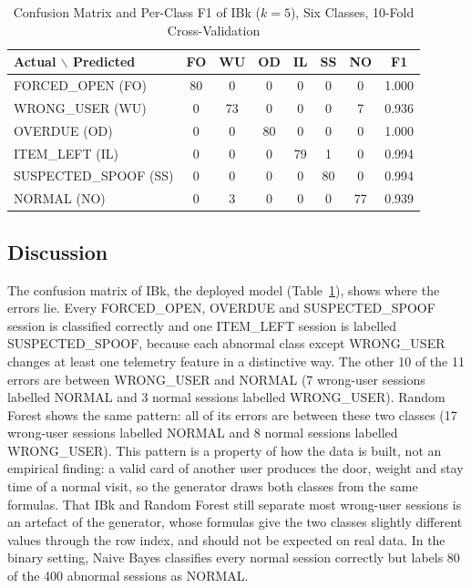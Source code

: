 \documentclass[conference, onecolumn]{IEEEtran}
\begin{document}
\begin{table}[H]
\renewcommand{\arraystretch}{1.3}
\centering
\caption{Confusion Matrix and Per-Class F1 of IBk ($k=5$), Six Classes, 10-Fold Cross-Validation}
\label{tab:cm}
\begin{tabular}{l c c c c c c c}
\hline
\textbf{Actual $\backslash$ Predicted} & \textbf{FO} & \textbf{WU} & \textbf{OD} & \textbf{IL} & \textbf{SS} & \textbf{NO} & \textbf{F1} \\
\hline
FORCED\_OPEN (FO)     & 80 & 0  & 0  & 0  & 0  & 0  & 1.000 \\
WRONG\_USER (WU)      & 0  & 73 & 0  & 0  & 0  & 7  & 0.936 \\
OVERDUE (OD)          & 0  & 0  & 80 & 0  & 0  & 0  & 1.000 \\
ITEM\_LEFT (IL)       & 0  & 0  & 0  & 79 & 1  & 0  & 0.994 \\
SUSPECTED\_SPOOF (SS) & 0  & 0  & 0  & 0  & 80 & 0  & 0.994 \\
NORMAL (NO)           & 0  & 3  & 0  & 0  & 0  & 77 & 0.939 \\
\hline
\end{tabular}
\end{table}

\subsection{Discussion}

The confusion matrix of IBk, the deployed model (Table~\ref{tab:cm}), shows where the errors
lie. Every FORCED\_OPEN, OVERDUE and SUSPECTED\_SPOOF session is classified correctly and one ITEM\_LEFT session is
labelled SUSPECTED\_SPOOF, because each abnormal class except WRONG\_USER changes at least one telemetry feature in a
distinctive way. The other 10 of the 11 errors are between WRONG\_USER and NORMAL (7 wrong-user sessions labelled
NORMAL and 3 normal sessions labelled WRONG\_USER). Random Forest shows the same pattern: all of its errors are between
these two classes (17 wrong-user sessions labelled NORMAL and 8 normal sessions labelled WRONG\_USER). This pattern is a
property of how the data is built, not an empirical finding: a valid card of another user produces the door, weight and
stay time of a normal visit, so the generator draws both classes from the same formulas. That IBk and Random Forest
still separate most wrong-user sessions is an artefact of the generator, whose formulas give the two classes slightly
different values through the row index, and should not be expected on real data. In the binary setting, Naive Bayes
classifies every normal session correctly but labels 80 of the 400 abnormal sessions as NORMAL.
\end{document}
